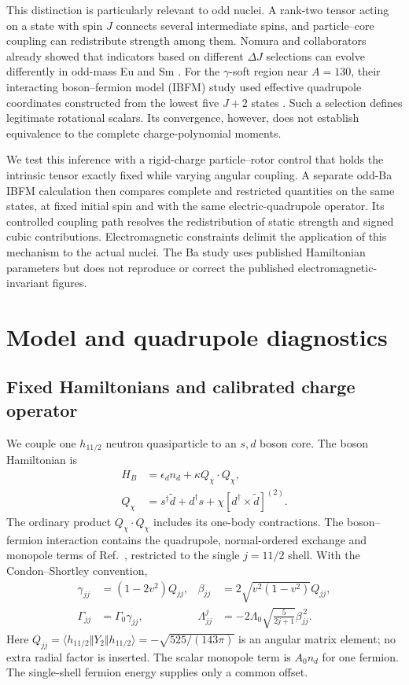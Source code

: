 \documentclass[pdflatex,iicol,sn-mathphys-num]{sn-jnl}
\begin{document}
This distinction is particularly relevant to odd nuclei. A rank-two tensor acting on a state with spin $J$ connects several intermediate spins, and particle--core coupling can redistribute strength among them. Nomura and collaborators already showed that indicators based on different $\Delta J$ selections can evolve differently in odd-mass Eu and Sm \cite{Nomura2016}. For the $\gamma$-soft region near $A=130$, their interacting boson--fermion model (IBFM) study used effective quadrupole coordinates constructed from the lowest five $J+2$ states \cite{Nomura2017}. Such a selection defines legitimate rotational scalars. Its convergence, however, does not establish equivalence to the complete charge-polynomial moments.

We test this inference with a rigid-charge particle--rotor control that holds the intrinsic tensor exactly fixed while varying angular coupling. A separate odd-Ba IBFM calculation then compares complete and restricted quantities on the same states, at fixed initial spin and with the same electric-quadrupole operator. Its controlled coupling path resolves the redistribution of static strength and signed cubic contributions. Electromagnetic constraints delimit the application of this mechanism to the actual nuclei. The Ba study uses published Hamiltonian parameters but does not reproduce or correct the published electromagnetic-invariant figures.

\section{Model and quadrupole diagnostics}\label{sec:method}

\subsection{Fixed Hamiltonians and calibrated charge operator}

We couple one $h_{11/2}$ neutron quasiparticle to an $s,d$ boson core. The boson Hamiltonian is
\begin{align}
H_B&=\epsilon_d n_d+\kappa Q_\chi\cdot Q_\chi,\\
Q_\chi&=s^\dagger\widetilde d+d^\dagger s
       +\chi[d^\dagger\times\widetilde d]^{(2)}.
\end{align}
The ordinary product $Q_\chi\cdot Q_\chi$ includes its one-body contractions. The boson--fermion interaction contains the quadrupole, normal-ordered exchange and monopole terms of Ref.~\cite{Nomura2017}, restricted to the single $j=11/2$ shell. With the Condon--Shortley convention,
\begin{align}
\gamma_{jj}&=(1-2v^2)Q_{jj},&
\beta_{jj}&=2\sqrt{v^2(1-v^2)}Q_{jj},\\
\Gamma_{jj}&=\Gamma_0\gamma_{jj},&
\Lambda_{jj}^{j}&=-2\Lambda_0
             \sqrt{\frac{5}{2j+1}}\beta_{jj}^{\,2}.
\end{align}
Here $Q_{jj}=\langle h_{11/2}\Vert Y_2\Vert h_{11/2}\rangle
=-\sqrt{525/(143\pi)}$ is an angular matrix element; no extra radial factor is inserted. The scalar monopole term is $A_0n_d$ for one fermion. The single-shell fermion energy supplies only a common offset.
\end{document}
